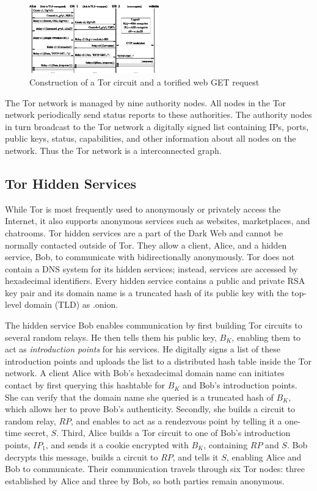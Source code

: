 \documentclass[journal]{IEEEtran}
\begin{document}
\begin{figure}[htbp]
	\centering
	\includegraphics[width=0.5\textwidth]{../images/onion_layers.eps}
	\caption{Construction of a Tor circuit and a torified web GET request}
	\label{fig:figure3}
\end{figure}

The Tor network is managed by nine authority nodes. All nodes in the Tor network periodically send status reports to these authorities. The authority nodes in turn broadcast to the Tor network a digitally signed list containing IPs, ports, public keys, status, capabilities, and other information about all nodes on the network. Thus the Tor network is a interconnected graph.

\subsection{Tor Hidden Services}

While Tor is most frequently used to anonymously or privately access the Internet, it also supports anonymous services such as websites, marketplaces, and chatrooms. Tor hidden services are a part of the Dark Web and cannot be normally contacted outside of Tor. They allow a client, Alice, and a hidden service, Bob, to communicate with bidirectionally anonymously. Tor does not contain a DNS system for its hidden services; instead, services are accessed by hexadecimal identifiers. Every hidden service contains a public and private RSA key pair and its domain name is a truncated hash of its public key with the top-level domain (TLD) as .onion.

The hidden service Bob enables communication by first building Tor circuits to several random relays. He then tells them his public key, $ B_{K} $, enabling them to act as \textit{introduction points} for his services. He digitally signs a list of these introduction points and uploads the list to a distributed hash table inside the Tor network. A client Alice with Bob's hexadecimal domain name can initiates contact by first querying this hashtable for $ B_{K} $ and Bob's introduction points. She can verify that the domain name she queried is a truncated hash of $ B_{K} $, which allows her to prove Bob's authenticity. Secondly, she builds a circuit to random relay, $ RP $, and enables to act as a rendezvous point by telling it a one-time secret, $ S $. Third, Alice builds a Tor circuit to one of Bob's introduction points, $ IP_{1} $, and sends it a cookie encrypted with $ B_{K} $, containing $ RP $ and $ S $. Bob decrypts this message, builds a circuit to $ RP $, and tells it $ S $, enabling Alice and Bob to communicate. Their communication travels through six Tor nodes: three established by Alice and three by Bob, so both parties remain anonymous.
\end{document}
